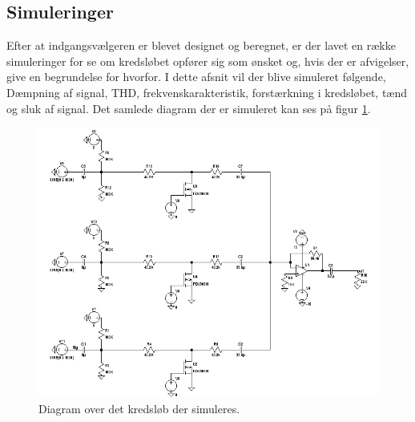 \subsection*{Simuleringer}
Efter at indgangsvælgeren er blevet designet og beregnet, er der lavet en række simuleringer for se om kredsløbet opfører sig som ønsket og, hvis der er afvigelser, give en begrundelse for hvorfor. I dette afsnit vil der blive simuleret følgende, Dæmpning af signal, THD, frekvenskarakteristik, forstærkning i kredsløbet, tænd og sluk af signal. Det samlede diagram der er simuleret kan ses på figur \ref{diagram_simulering}. 

\begin{figure}[h]
\centering
\includegraphics[scale=0.5]{teknisk/indgangsvaelger/simulering/indgangvaelger_ltspice_diagram.png}
\caption{Diagram over det kredsløb der simuleres.}
\label{diagram_simulering}
\end{figure}

